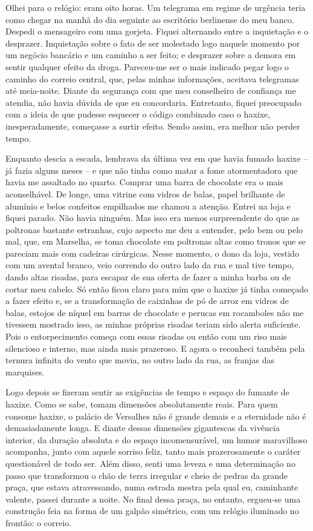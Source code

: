 Olhei para o relógio: eram oito horas. Um telegrama em regime de
urgência teria como chegar na manhã do dia seguinte ao escritório
berlinense do meu banco. Despedi o mensageiro com uma gorjeta. Fiquei
alternando entre a inquietação e o desprazer. Inquietação sobre o fato
de ser molestado logo naquele momento por um negócio bancário e um
caminho a ser feito; e desprazer sobre a demora em sentir qualquer
efeito da droga. Pareceu-me ser o mais indicado pegar logo o caminho do
correio central, que, pelas minhas informações, aceitava telegramas até
meia-noite. Diante da segurança com que meu conselheiro de confiança me
atendia, não havia dúvida de que eu concordaria. Entretanto, fiquei
preocupado com a ideia de que pudesse esquecer o código combinado caso o
haxixe, inesperadamente, começasse a surtir efeito. Sendo assim, era
melhor não perder tempo.

Enquanto descia a escada, lembrava da última vez em que havia fumado
haxixe -- já fazia alguns meses -- e que não tinha como matar a fome
atormentadora que havia me assaltado no quarto. Comprar uma barra de
chocolate era o mais aconselhável. De longe, uma vitrine com vidros de
balas, papel brilhante de alumínio e belos confeitos empilhados me
chamou a atenção. Entrei na loja e fiquei parado. Não havia ninguém. Mas
isso era menos surpreendente do que as poltronas bastante estranhas,
cujo aspecto me deu a entender, pelo bem ou pelo mal, que, em
Marselha, se toma chocolate em poltronas altas como tronos que se
pareciam mais com cadeiras cirúrgicas. Nesse momento, o dono da loja,
vestido com um avental branco, veio correndo do outro lado da rua e mal
tive tempo, dando altas risadas, para escapar de sua oferta de fazer a
minha barba ou de cortar meu cabelo. Só então ficou claro para mim que o
haxixe já tinha começado a fazer efeito e, se a transformação de
caixinhas de pó de arroz em vidros de balas, estojos de níquel em barras
de chocolate e perucas em rocamboles não me tivessem mostrado isso, as
minhas próprias risadas teriam sido alerta suficiente. Pois o
entorpecimento começa com essas risadas ou então com um riso mais
silencioso e interno, mas ainda mais prazeroso. E agora o reconheci
também pela ternura infinita do vento que movia, no outro lado da rua,
as franjas das marquises.

Logo depois se fizeram sentir as exigências de tempo e espaço do fumante
de haxixe. Como se sabe, tomam dimensões absolutamente reais. Para quem
consome haxixe, o palácio de Versalhes não é grande demais e a
eternidade não é demasiadamente longa. E diante dessas dimensões
gigantescas da vivência interior, da duração absoluta e do espaço
incomensurável, um humor maravilhoso acompanha, junto com aquele sorriso
feliz, tanto mais prazerosamente o caráter questionável de todo ser.
Além disso, senti uma leveza e uma determinação no passo que transformou
o chão de terra irregular e cheio de pedras da grande praça, que estava
atravessando, numa estrada mestra pela qual eu, caminhante valente,
passei durante a noite. No final dessa praça, no entanto, ergueu-se uma
construção feia na forma de um galpão simétrico, com um relógio
iluminado no frontão: o correio.

